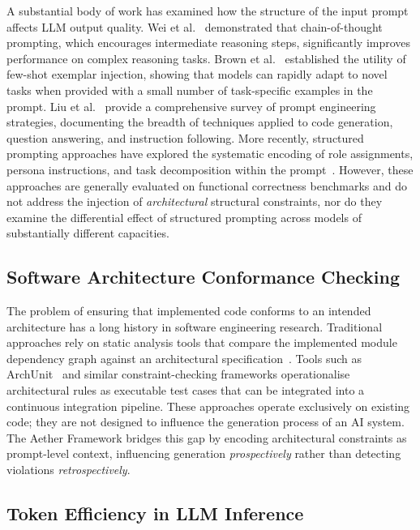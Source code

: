 \documentclass[review,12pt,3p]{elsarticle}
\begin{document}
A substantial body of work has examined how the structure of the input prompt affects LLM
output quality. Wei et al.~\citep{Wei2022ChainOfThought} demonstrated that chain-of-thought
prompting, which encourages intermediate reasoning steps, significantly improves performance
on complex reasoning tasks. Brown et al.~\citep{Brown2020GPT3} established the utility of
few-shot exemplar injection, showing that models can rapidly adapt to novel tasks when
provided with a small number of task-specific examples in the prompt. Liu et
al.~\citep{Liu2023PromptSurvey} provide a comprehensive survey of prompt engineering
strategies, documenting the breadth of techniques applied to code generation, question
answering, and instruction following. More recently, structured prompting approaches have
explored the systematic encoding of role assignments, persona instructions, and task
decomposition within the prompt~\citep{Jiang2020StructuredPrompt}. However, these
approaches are generally evaluated on functional correctness benchmarks and do not address
the injection of \emph{architectural} structural constraints, nor do they examine the
differential effect of structured prompting across models of substantially different
capacities.

\subsection{Software Architecture Conformance Checking}

The problem of ensuring that implemented code conforms to an intended architecture has a
long history in software engineering research. Traditional approaches rely on static
analysis tools that compare the implemented module dependency graph against an architectural
specification~\citep{deGraft2009ArchConformance}. Tools such as ArchUnit~\citep{ArchUnit2021}
and similar constraint-checking frameworks operationalise architectural rules as executable
test cases that can be integrated into a continuous integration pipeline. These approaches
operate exclusively on existing code; they are not designed to influence the generation
process of an AI system. The Aether Framework bridges this gap by encoding architectural
constraints as prompt-level context, influencing generation \emph{prospectively} rather
than detecting violations \emph{retrospectively}.

\subsection{Token Efficiency in LLM Inference}
\end{document}
